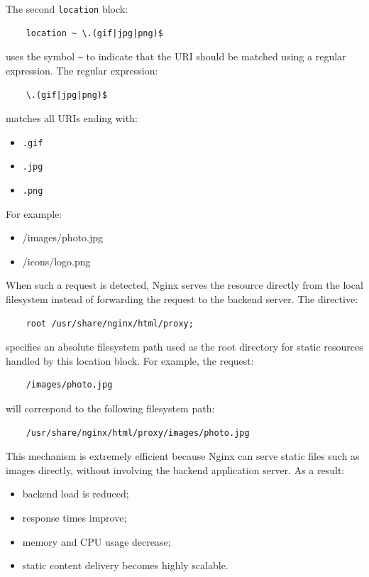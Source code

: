 \documentclass{scrbook}
\begin{document}
	The second \texttt{location} block:
	
	\begin{verbatim}
	location ~ \.(gif|jpg|png)$
	\end{verbatim}
	
	uses the symbol \texttt{\textasciitilde{}} to indicate that the URI should be matched using a regular expression. The regular expression:
	
	\begin{verbatim}
	\.(gif|jpg|png)$
	\end{verbatim}
	
	matches all URIs ending with:
	\begin{itemize}
		\item \texttt{.gif}
		\item \texttt{.jpg}
		\item \texttt{.png}
	\end{itemize}
	
	For example:
	
	\begin{itemize}
		\item /images/photo.jpg
		\item /icons/logo.png
	\end{itemize}
	
	When such a request is detected, Nginx serves the resource directly from the local filesystem instead of forwarding the request to the backend server. The directive:
	
	\begin{verbatim}
	root /usr/share/nginx/html/proxy;
	\end{verbatim}
	
	specifies an absolute filesystem path used as the root directory for static resources handled by this location block. For example, the request:
	
	\begin{verbatim}
	/images/photo.jpg
	\end{verbatim}
	
	will correspond to the following filesystem path:
	
	\begin{verbatim}
	/usr/share/nginx/html/proxy/images/photo.jpg
	\end{verbatim}
	
	This mechanism is extremely efficient because Nginx can serve static files such as images directly, without involving the backend application server. As a result:
	\begin{itemize}
		\item backend load is reduced;
		\item response times improve;
		\item memory and CPU usage decrease;
		\item static content delivery becomes highly scalable.
	\end{itemize}
	
\end{document}
